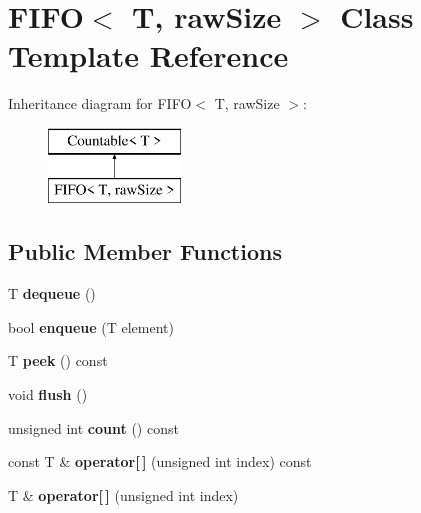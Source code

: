 \hypertarget{class_f_i_f_o}{}\section{F\+I\+F\+O$<$ T, raw\+Size $>$ Class Template Reference}
\label{class_f_i_f_o}
Inheritance diagram for F\+I\+F\+O$<$ T, raw\+Size $>$\+:\begin{figure}[H]
\begin{center}
\leavevmode
\includegraphics[height=2.000000cm]{class_f_i_f_o}
\end{center}
\end{figure}
\subsection*{Public Member Functions}
\begin{DoxyCompactItemize}
\item 
\hypertarget{class_f_i_f_o_a8cbc6e8fe109581b7dad5bc0b69f5326}{}T {\bfseries dequeue} ()\label{class_f_i_f_o_a8cbc6e8fe109581b7dad5bc0b69f5326}

\item 
\hypertarget{class_f_i_f_o_aae0f318e05930819896ad50075a2e3b7}{}bool {\bfseries enqueue} (T element)\label{class_f_i_f_o_aae0f318e05930819896ad50075a2e3b7}

\item 
\hypertarget{class_f_i_f_o_aea09087d6916d1da1ad26c572deeb250}{}T {\bfseries peek} () const \label{class_f_i_f_o_aea09087d6916d1da1ad26c572deeb250}

\item 
\hypertarget{class_f_i_f_o_ae6bf4ed61af9e534f29ed450f5207702}{}void {\bfseries flush} ()\label{class_f_i_f_o_ae6bf4ed61af9e534f29ed450f5207702}

\item 
\hypertarget{class_f_i_f_o_a822ba9631279ff47cd843a5273a101f8}{}unsigned int {\bfseries count} () const \label{class_f_i_f_o_a822ba9631279ff47cd843a5273a101f8}

\item 
\hypertarget{class_f_i_f_o_af640bb36ab136ea226538e333e97c878}{}const T \& {\bfseries operator\mbox{[}$\,$\mbox{]}} (unsigned int index) const \label{class_f_i_f_o_af640bb36ab136ea226538e333e97c878}

\item 
\hypertarget{class_f_i_f_o_a8704685595a6d464c66ccce3a3b94a6b}{}T \& {\bfseries operator\mbox{[}$\,$\mbox{]}} (unsigned int index)\label{class_f_i_f_o_a8704685595a6d464c66ccce3a3b94a6b}

\end{DoxyCompactItemize}
